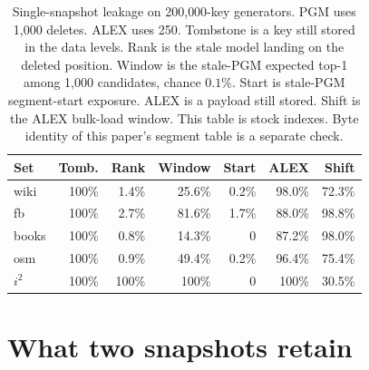 \documentclass[conference]{IEEEtran}
\begin{document}
\begin{table}[t]
\caption{Single-snapshot leakage on 200{,}000-key generators.
PGM uses 1{,}000 deletes.
ALEX uses 250.
Tombstone is a key still stored in the data levels.
Rank is the stale model landing on the deleted position.
Window is the stale-PGM expected top-1 among 1{,}000 candidates, chance $0.1\%$.
Start is stale-PGM segment-start exposure.
ALEX is a payload still stored.
Shift is the ALEX bulk-load window.
This table is stock indexes. Byte identity of this paper's segment table is a separate check.}
\label{tab:t1}
\centering
\scriptsize
\begin{tabular}{@{}lrrrrrr@{}}
\toprule
Set & Tomb. & Rank & Window & Start & ALEX & Shift \\
\midrule
wiki   & 100\% & 1.4\% & 25.6\% & 0.2\% & 98.0\% & 72.3\% \\
fb     & 100\% & 2.7\% & 81.6\% & 1.7\% & 88.0\% & 98.8\% \\
books  & 100\% & 0.8\% & 14.3\% & 0 & 87.2\% & 98.0\% \\
osm    & 100\% & 0.9\% & 49.4\% & 0.2\% & 96.4\% & 75.4\% \\
\addlinespace
$i^{2}$ & 100\% & 100\% & 100\%  & 0 & 100\%  & 30.5\% \\
\bottomrule
\end{tabular}
\end{table}

\section{What two snapshots retain}
\label{sec:t2}
\end{document}

